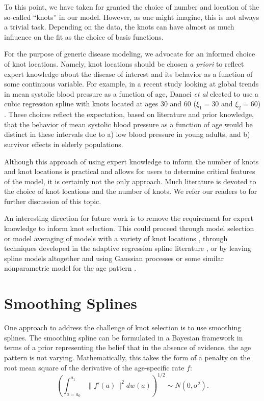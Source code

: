 To this point, we have taken for granted the choice of number and
location of the so-called ``knots'' in our model. However, as one
might imagine, this is not always a trivial task. Depending on the
data, the knots can have almost as much influence on the fit as
the choice of basis functions.

For the purpose of generic disease modeling, we advocate for an
informed choice of knot locations. Namely, knot locations should be
chosen \emph{a priori} to reflect expert knowledge about the disease
of interest and its behavior as a function of some continuous
variable. For example, in a recent study looking at global trends in
mean systolic blood pressure as a function of age, Danaei \emph{et al}
elected to use a cubic regression spline with knots located at ages 30
and 60 ($\xi_1 = 30$ and $\xi_2=60$) \cite{Danaei_National_2011}. These
choices reflect the expectation, based on literature and prior
knowledge, that the behavior of mean systolic blood pressure as a
function of age would be distinct in these intervals due to a) low
blood pressure in young adults, and b) survivor effects in elderly
populations.

Although this approach of using expert knowledge to inform the number
of knots and knot locations is practical and allows for users to
determine critical features of the model, it is certainly not the only
approach. Much literature is devoted to the choice of knot locations
and the number of knots. We refer our readers to \cite{ESL,
  Wand2001[KP2]} for further discussion of this topic.

An interesting direction for future work is to remove the requirement
for expert knowledge to inform knot selection.  This could proceed
through model selection or model averaging of models with a variety of
knot locations \cite{[ref baysian model averaging[KP3]]}, through
techniques developed in the adaptive regression spline literature
\cite{[ref[KP4]]}, or by leaving spline models altogether and using Gaussian
processes or some similar nonparametric model for the age pattern
\cite{[ref GP[KP5]]}.

\section{Smoothing Splines}
One approach to address the challenge of knot selection is to use
smoothing splines.  The smoothing spline can be formulated in a
Bayesian framework in terms of a prior representing the belief that in
the absence of evidence, the age pattern is not varying.
Mathematically, this takes the form of a penalty on the root mean
square of the derivative of the age-specific rate $f$:
\[
\left(\int _{a=a_0} ^{a_1} \| f'(a) \|^2 dw(a)\right)^{1/2} \sim N(0, \sigma^2).
\]

